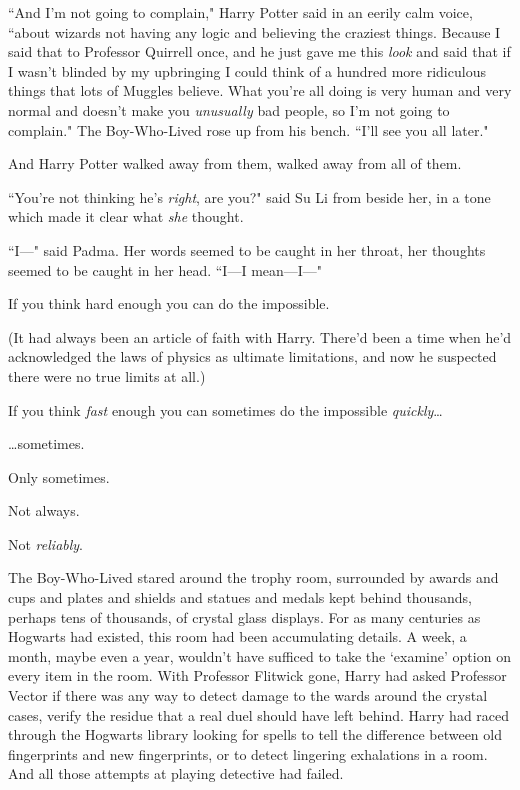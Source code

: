 ``And I'm not going to complain," Harry Potter said in an eerily calm voice, ``about wizards not having any logic and believing the craziest things. Because I said that to Professor Quirrell once, and he just gave me this \emph{look} and said that if I wasn't blinded by my upbringing I could think of a hundred more ridiculous things that lots of Muggles believe. What you're all doing is very human and very normal and doesn't make you \emph{unusually} bad people, so I'm not going to complain." The Boy-Who-Lived rose up from his bench. ``I'll see you all later."

And Harry Potter walked away from them, walked away from all of them.

``You're not thinking he's \emph{right}, are you?" said Su Li from beside her, in a tone which made it clear what \emph{she} thought.

``I—" said Padma. Her words seemed to be caught in her throat, her thoughts seemed to be caught in her head. ``I—I mean—I—"

\later

If you think hard enough you can do the impossible.

(It had always been an article of faith with Harry. There'd been a time when he'd acknowledged the laws of physics as ultimate limitations, and now he suspected there were no true limits at all.)

If you think \emph{fast} enough you can sometimes do the impossible \emph{quickly}{\ldots}

{\ldots}sometimes.

Only sometimes.

Not always.

Not \emph{reliably}.

The Boy-Who-Lived stared around the trophy room, surrounded by awards and cups and plates and shields and statues and medals kept behind thousands, perhaps tens of thousands, of crystal glass displays. For as many centuries as Hogwarts had existed, this room had been accumulating details. A week, a month, maybe even a year, wouldn't have sufficed to take the `examine' option on every item in the room. With Professor Flitwick gone, Harry had asked Professor Vector if there was any way to detect damage to the wards around the crystal cases, verify the residue that a real duel should have left behind. Harry had raced through the Hogwarts library looking for spells to tell the difference between old fingerprints and new fingerprints, or to detect lingering exhalations in a room. And all those attempts at playing detective had failed.

